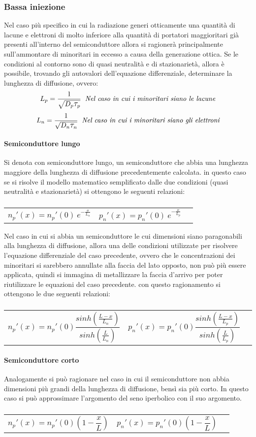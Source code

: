 \documentclass[12pt,a4paper]{article}
\makeatletter
\newcommand{\Tau}{ \mathlarger{\mathlarger{ \tau }}}
\newcommand{\deqlist}[5]{
	\subsubsection*{#1}
	
	\parbox{19cm}{#2}
	
	\noindent\begin{tabularx}{\textwidth}{@{}XXX@{}}
	\begin{equation}
	#3
	\end{equation}  & 
	\begin{equation}
	#4
	\end{equation}
	
	\end{tabularx}
	
	\noindent\parbox{19cm}{#5}}
\makeatother
\begin{document}
		\subsubsection{Bassa iniezione}
            Nel caso più specifico in cui la radiazione generi otticamente una quantità di lacune e elettroni di molto  inferiore alla quantità di portatori maggioritari già presenti all'interno del semiconduttore allora si ragionerà principalmente sull'ammontare di minoritari in eccesso a causa della generazione ottica. 
            Se le condizioni al contorno sono di quasi neutralità e di stazionarietà, allora è possibile, trovando gli autovalori dell'equazione differenziale, determinare la lunghezza di diffusione, ovvero:
            \[ L_{p} = \frac{1}{\sqrt{D_{p} \Tau_{p}}} \;\; \textit{Nel caso in cui i minoritari siano le lacune} \]
            \[ L_{n} = \frac{1}{\sqrt{D_{n} \Tau_{n}}} \;\; \textit{Nel caso in cui i minoritari siano gli elettroni} \]
            \paragraph{Semiconduttore lungo}
            Si denota con semiconduttore lungo, un semiconduttore che abbia una lunghezza maggiore della lunghezza di diffusione precedentemente calcolata.
            in questo caso se si risolve il modello matematico semplificato dalle due condizioni (quasi neutralità e stazionarietà) si ottengono le seguenti relazioni:
            \deqlist{}{}
            {n_{p}'(x) = n_{p}'(0) \ e^{-\frac{x}{L_{n}}}}
            { p_{n}'(x) = p_{n}'(0) \ e^{-\frac{x}{L_{p}}}}
            {}
            
            Nel caso in cui si abbia un semiconduttore le cui dimensioni siano paragonabili alla lunghezza di diffusione, allora una delle condizioni utilizzate per risolvere l'equazione differenziale del caso precedente, ovvero che le concentrazioni dei minoritari si sarebbero annullate alla faccia del lato opposto, non può più essere applicata, quindi si immagina di metallizzare la faccia d'arrivo per poter riutilizzare le equazioni del caso precedente. con questo ragionamento si ottengono le due seguenti relazioni:
            \deqlist{}{}
            { n_{p}'(x) = n_{p}'(0) \frac{sinh(\frac{L-x}{L_{n}})}{sinh(\frac{L}{L_{n}})} }
            { p_{n}'(x) = p_{n}'(0) \frac{sinh(\frac{L-x}{L_{p}})}{sinh(\frac{L}{L_{p}})} }
            {}
            
            \paragraph{Semiconduttore corto}
            Analogamente si può ragionare nel caso in cui il semiconduttore non abbia dimensioni più grandi della lunghezza di diffusione, bensì sia più corto. In questo caso si può approssimare l'argomento del seno iperbolico con il suo argomento.
            \deqlist{}{}
            { n_{p}'(x) = n_{p}'(0)(1-\frac{x}{L}) }
            { p_{n}'(x) = p_{n}'(0)(1-\frac{x}{L}) }
            {}
\end{document}
